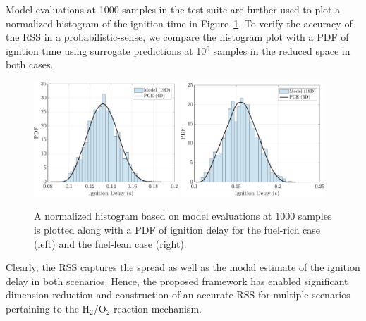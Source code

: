 Model evaluations at 1000 samples in the test suite
are further used to plot a normalized histogram of the ignition time in 
Figure~\ref{fig:pdf_kinetics}. To verify the accuracy of the RSS in a 
probabilistic-sense, we compare the histogram plot with a PDF of ignition time
using surrogate predictions at 10$^{6}$ samples in the reduced space in both cases. 
%
\begin{figure}[htbp]
 \begin{center}
  \includegraphics[width=0.48\textwidth]{./Figures/pdf_comp_rich}
  \includegraphics[width=0.48\textwidth]{./Figures/pdf_comp_lean}
\caption{A normalized histogram based on model evaluations at 1000 samples is plotted
along with a PDF of ignition delay for the fuel-rich case (left) and the fuel-lean
case (right).}
\label{fig:pdf_kinetics}
\end{center}
\end{figure}
%
Clearly, the RSS captures the spread as well as the modal estimate of
the ignition delay in both scenarios. Hence, the proposed framework 
has enabled significant dimension reduction and construction of an accurate
RSS for multiple scenarios pertaining to the H$_2$/O$_2$ reaction
mechanism.    
